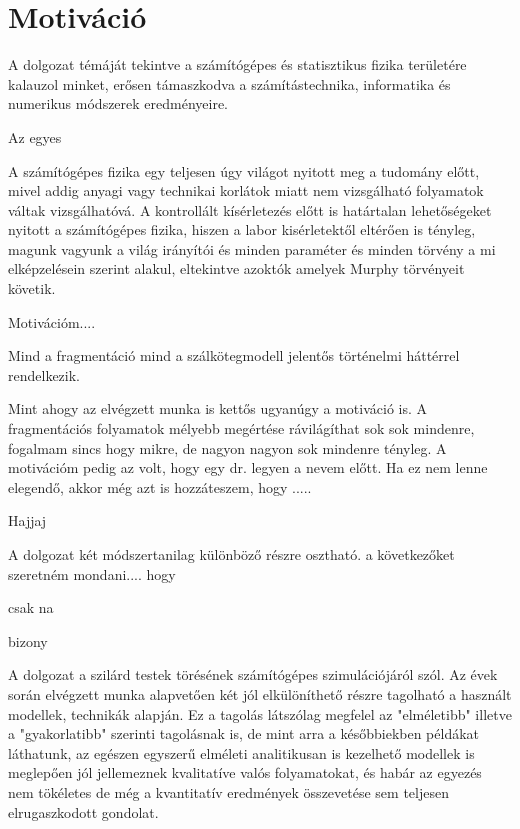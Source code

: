 \chapter{Motiváció}
\label{chapt:motivation}

A dolgozat témáját tekintve a számítógépes és statisztikus fizika területére kalauzol minket, erősen támaszkodva a számítástechnika, informatika és numerikus módszerek eredményeire.



Az egyes

A számítógépes fizika egy teljesen úgy világot nyitott meg a tudomány előtt, mivel addig anyagi vagy technikai korlátok miatt nem vizsgálható folyamatok váltak vizsgálhatóvá. A kontrollált kísérletezés előtt is határtalan lehetőségeket nyitott a számítógépes fizika, hiszen a labor kisérletektől eltérően is tényleg, magunk vagyunk a világ irányítói és minden paraméter és minden törvény a mi elképzelésein szerint alakul, eltekintve azoktók amelyek Murphy törvényeit követik. 


Motivációm....	


Mind a fragmentáció mind a szálkötegmodell jelentős történelmi háttérrel rendelkezik. 

Mint ahogy az elvégzett munka is kettős ugyanúgy a motiváció is. A fragmentációs folyamatok mélyebb megértése rávilágíthat sok sok mindenre, fogalmam sincs hogy mikre, de nagyon nagyon sok mindenre tényleg. A motivációm pedig az volt, hogy egy dr. legyen a nevem előtt. Ha ez nem lenne elegendő, akkor még azt is hozzáteszem, hogy .....

Hajjaj

A dolgozat két módszertanilag különböző részre osztható. 
a következőket szeretném mondani.... hogy   

csak na

bizony

A dolgozat a szilárd testek törésének számítógépes szimulációjáról szól. Az évek során elvégzett munka alapvetően két jól elkülöníthető részre tagolható a használt modellek, technikák alapján. Ez a tagolás látszólag megfelel az "elméletibb" illetve a "gyakorlatibb" szerinti tagolásnak is, de mint arra a későbbiekben példákat láthatunk, az egészen egyszerű elméleti analitikusan is kezelhető modellek is meglepően jól jellemeznek kvalitatíve valós folyamatokat, és habár az egyezés nem tökéletes de még a kvantitatív eredmények összevetése sem teljesen elrugaszkodott gondolat. 

